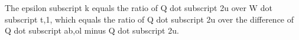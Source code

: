 The epsilon subscript k equals the ratio of Q dot subscript 2u over W dot subscript t,1, which equals the ratio of Q dot subscript 2u over the difference of Q dot subscript ab,ol minus Q dot subscript 2u.